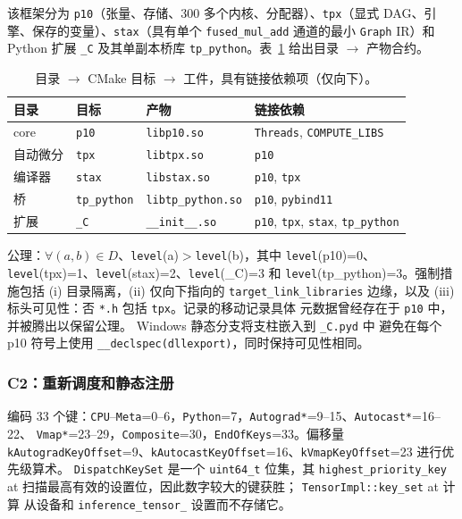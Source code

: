 该框架分为 \texttt{p10}（张量、存储、300 多个内核、分配器）、\texttt{tpx}（显式 DAG、引擎、保存的变量）、\texttt{stax}（具有单个 \texttt{fused\_mul\_add} 通道的最小 \texttt{Graph} IR）和 Python 扩展 \texttt{\_C} 及其单副本桥库 \texttt{tp\_python}。表~\ref{tab:intro:pillars} 给出目录 $\rightarrow$ 产物合约。
\begin{table}[H]
\centering
\caption{目录 $\rightarrow$ CMake 目标 $\rightarrow$ 工件，具有链接依赖项（仅向下）。}
\label{tab:intro:pillars}
\small
\begin{tabular}{p{2.0cm}p{1.4cm}p{3.6cm}p{4.8cm}}
\toprule
目录 & 目标 & 产物 & 链接依赖 \\
\midrule
core & \texttt{p10} & \texttt{libp10.so} & \texttt{Threads}, \texttt{COMPUTE\_LIBS} \\
自动微分 & \texttt{tpx} & \texttt{libtpx.so} & \texttt{p10} \\
编译器 & \texttt{stax} & \texttt{libstax.so} & \texttt{p10}, \texttt{tpx} \\
桥 & \texttt{tp\_python} & \texttt{libtp\_python.so} & \texttt{p10}, \texttt{pybind11} \\
扩展 & \texttt{\_C} & \texttt{\_\_init\_\_.so} & \texttt{p10}, \texttt{tpx}, \texttt{stax}, \texttt{tp\_python} \\
\bottomrule
\end{tabular}
\end{table}

公理：$\forall (a,b)\in D$、\texttt{level}(a)$>$\texttt{level}(b)，其中 \texttt{level}(p10)=0、\texttt{level}(tpx)=1、\texttt{level}(stax)=2、\texttt{level}(\_C)=3 和
\texttt{level}(tp\_python)=3。强制措施包括 (i) 目录隔离，(ii) 仅向下指向的 \texttt{target\_link\_libraries} 边缘，以及 (iii) 标头可见性：否
\texttt{*.h} 包括 \texttt{tpx}。记录的移动记录具体
元数据曾经存在于 \texttt{p10} 中，并被腾出以保留公理。 Windows 静态分支将支柱嵌入到 \texttt{\_C.pyd} 中
避免在每个 p10 符号上使用 \texttt{\_\_declspec(dllexport)}，同时保持可见性相同。

\subsubsection{C2：重新调度和静态注册}
\label{sec:intro:c2}

编码 33 个键：\texttt{CPU}--\texttt{Meta}=0--6，\texttt{Python}=7，\texttt{Autograd*}=9--15、\texttt{Autocast*}=16--22、
\texttt{Vmap*}=23--29，\texttt{Composite}=30，\texttt{EndOfKeys}=33。偏移量 \texttt{kAutogradKeyOffset}=9、\texttt{kAutocastKeyOffset}=16、\texttt{kVmapKeyOffset}=23
 进行优先级算术。 \texttt{DispatchKeySet} 是一个 \texttt{uint64\_t} 位集，其 \texttt{highest\_priority\_key}
at 扫描最高有效的设置位，因此数字较大的键获胜； \texttt{TensorImpl::key\_set} at 计算
从设备和 \texttt{inference\_tensor\_} 设置而不存储它。

